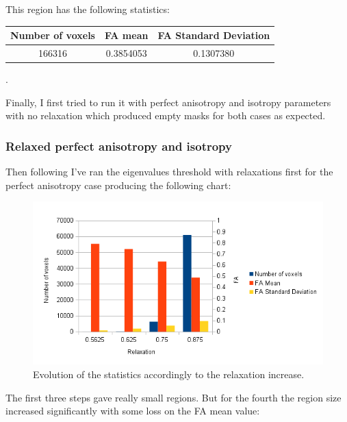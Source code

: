 \documentclass[a4paper,11pt]{report}
\begin{document}
      This region has the following statistics:

      \begin{tabular}{| c | c | c |}
        \hline
        Number of voxels & FA mean & FA Standard Deviation \\ \hline
        166316 & 0.3854053 & 0.1307380 \\ \hline
      \end{tabular}

      .\newline

      Finally, I first tried to run it with perfect anisotropy and isotropy parameters with no relaxation which produced empty masks for both cases as expected.

      \newpage

      \subsubsection{Relaxed perfect anisotropy and isotropy}
      Then following I've ran the eigenvalues threshold with relaxations first for the perfect anisotropy case producing the following chart:

      \begin{figure}[H]
        \includegraphics[width=1\linewidth]{imgs/perfect_anisotropy_relaxed_chart.png}
        \caption{Evolution of the statistics accordingly to the relaxation increase.}
        \label{fig:perf-ani-chart}
      \end{figure}

      The first three steps gave really small regions. But for the fourth the region size increased significantly with some loss on the FA mean value:
\end{document}
